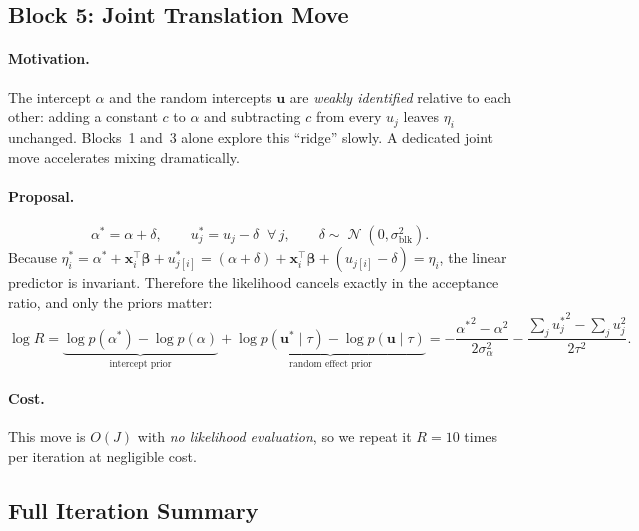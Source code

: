 \documentclass[11pt]{article}
\newcommand{\bx}{\bm{x}}
\newcommand{\bbeta}{\bm{\beta}}
\newcommand{\bu}{\bm{u}}
\DeclareMathOperator{\Normal}{\mathcal{N}}
\begin{document}
\subsection{Block 5: Joint Translation Move}
\label{sec:block-joint}

\paragraph{Motivation.}
The intercept $\alpha$ and the random intercepts $\bu$ are
\emph{weakly identified} relative to each other: adding a constant $c$
to $\alpha$ and subtracting $c$ from every $u_j$ leaves $\eta_i$
unchanged. Blocks~1 and~3 alone explore this ``ridge'' slowly. A
dedicated joint move accelerates mixing dramatically.

\paragraph{Proposal.}
\begin{equation}\label{eq:joint-move}
  \alpha^* = \alpha + \delta, \qquad
  u_j^* = u_j - \delta \;\;\forall\, j,
  \qquad \delta \sim \Normal(0,\sigma_{\text{blk}}^2).
\end{equation}
Because $\eta_i^* = \alpha^* + \bx_i^\top\bbeta + u_{j[i]}^*
= (\alpha + \delta) + \bx_i^\top\bbeta + (u_{j[i]} - \delta) = \eta_i$,
the linear predictor is invariant. Therefore the likelihood cancels
exactly in the acceptance ratio, and only the priors matter:
\begin{equation}\label{eq:ar-block}
  \log R
  = \underbrace{\log p(\alpha^*) - \log p(\alpha)}_{\text{intercept prior}}
  + \underbrace{\log p(\bu^*\mid\tau) - \log p(\bu\mid\tau)}_{\text{random effect prior}}
  = -\frac{{\alpha^*}^2 - \alpha^2}{2\sigma_\alpha^2}
    - \frac{\sum_j {u_j^*}^2 - \sum_j u_j^2}{2\tau^2}.
\end{equation}

\paragraph{Cost.} This move is $O(J)$ with \emph{no likelihood
evaluation}, so we repeat it $R = 10$ times per iteration at negligible cost.

\subsection{Full Iteration Summary}
\end{document}
